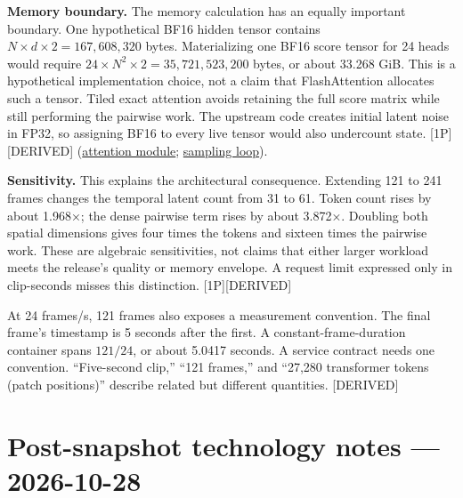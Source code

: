\textbf{Memory boundary.} The memory calculation has an equally
important boundary. One hypothetical BF16 hidden tensor contains
\(N\times d\times2=167{,}608{,}320\) bytes. Materializing one BF16 score
tensor for 24 heads would require
\(24\times N^2\times2=35{,}721{,}523{,}200\) bytes, or about 33.268 GiB.
This is a hypothetical implementation choice, not a claim that
FlashAttention allocates such a tensor. Tiled exact attention avoids
retaining the full score matrix while still performing the pairwise
work. The upstream code creates initial latent noise in FP32, so
assigning BF16 to every live tensor would also undercount state.
\mbox{{[}1P{]}}\hspace{0pt}\mbox{{[}DERIVED{]}}
(\href{https://github.com/Wan-Video/Wan2.2/blob/1ea34ff48f87168174e12956e200b1d908b1c5ff/wan/modules/attention.py}{attention
module};
\href{https://github.com/Wan-Video/Wan2.2/blob/1ea34ff48f87168174e12956e200b1d908b1c5ff/wan/textimage2video.py}{sampling
loop}).

\textbf{Sensitivity.} This explains the architectural consequence.
Extending 121 to 241 frames changes the temporal latent count from 31 to
61. Token count rises by about 1.968×; the dense pairwise term rises by
about 3.872×. Doubling both spatial dimensions gives four times the
tokens and sixteen times the pairwise work. These are algebraic
sensitivities, not claims that either larger workload meets the
release's quality or memory envelope. A request limit expressed only in
clip-seconds misses this distinction. \mbox{{[}1P{]}}\hspace{0pt}\mbox{{[}DERIVED{]}}

At 24 frames/s, 121 frames also exposes a measurement convention. The
final frame's timestamp is 5 seconds after the first. A
constant-frame-duration container spans \(121/24\), or about 5.0417
seconds. A service contract needs one convention. ``Five-second clip,''
``121 frames,'' and ``27,280 transformer tokens (patch positions)''
describe related but different quantities. \mbox{{[}DERIVED{]}}

\section*{Post-snapshot technology notes ---
2026-10-28}\label{post-snapshot-technology-notes-2026-10-28}

